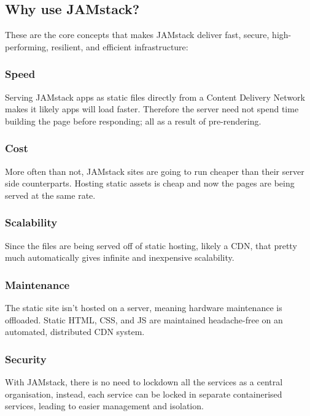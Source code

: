 \subsection{Why use JAMstack?}

These are the core concepts that makes JAMstack deliver fast, secure, high-performing, resilient, and efficient infrastructure:

\subsubsection{Speed}

Serving JAMstack apps as static files directly from a Content Delivery Network makes it 
likely apps will load faster. Therefore the server need not spend time building the page 
before responding; all as a result of pre-rendering. 

\subsubsection{Cost}

More often than not, JAMstack sites are going to run cheaper than their server side counterparts. 
Hosting static assets is cheap and now the pages are being served at the same rate.

\subsubsection{Scalability}

Since the files are being served off of static hosting, likely a CDN, 
that pretty much automatically gives infinite and inexpensive scalability.

\subsubsection{Maintenance}

The static site isn’t hosted on a server, meaning hardware maintenance is offloaded. 
Static HTML, CSS, and JS are maintained headache-free on an automated, distributed CDN system.

\subsubsection{Security}

With JAMstack, there is no need to lockdown all the services as a central organisation, instead, 
each service can be locked in separate containerised services, leading to easier management and isolation.

